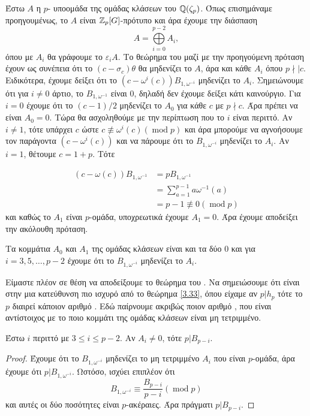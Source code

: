 \noindent Έστω $A$ η $p$- υποομάδα της ομάδας κλάσεων του $\mathbb{Q}(\zeta_p)$. Όπως επισημάναμε προηγουμένως, το $A$ είναι $\mathbb{Z}_p[G]$-πρότυπο και άρα έχουμε την διάσπαση
$$A = \bigoplus\limits_{i=0}^{p-2}A_i,$$
όπου με $A_i$ θα γράφουμε το $\varepsilon_i A$. Το θεώρημα του  μαζί με την προηγούμενη πρόταση έχουν ως συνέπεια ότι 
το $(c-\sigma_c)\theta$ θα μηδενίζει το $A$, άρα και κάθε $A_i$ όπου $p\nmid | c$. Ειδικότερα, έχουμε δείξει ότι το 
$(c-\omega^i(c))B_{1,\omega^{-i}}$ μηδενίζει το $A_i$. Σημειώνουμε ότι για $i\neq 0$ άρτιο, το $B_{1,\omega^{-1}}$ είναι $0$, δηλαδή 
δεν έχουμε δείξει κάτι καινούργιο. Για $i=0$ έχουμε ότι το $(c-1)/2$ μηδενίζει το $A_0$ για κάθε $c$ με $p\nmid c$. Άρα πρέπει να είναι 
$A_0 = 0$. Τώρα θα ασχοληθούμε με την περίπτωση που το $i$ είναι περιττό. Αν $i\neq 1$, τότε υπάρχει $c$ ώστε 
$c\not\equiv \omega^i(c)(\operatorname{mod}p)$ και άρα μπορούμε να αγνοήσουμε τον παράγοντα $(c-\omega^i(c))$ και να πάρουμε ότι 
το $B_{1,\omega^{-i}}$ μηδενίζει το $A_i$. Αν $i=1$, θέτουμε $c=1+p$. Τότε 

\begin{align*}
	(c-\omega(c))B_{1,\omega^{-1}} &= pB_{1,\omega^{-1}} \\
	&= \sum\limits_{a=1}^{p-1}a\omega^{-1}(a) \\ 
	&= p-1 \not\equiv 0 (\operatorname{mod}p)
\end{align*}
και καθώς το $A_1$ είναι $p$-ομάδα, υποχρεωτικά έχουμε $A_1 = 0$. Άρα έχουμε αποδείξει την ακόλουθη πρόταση.

\begin{prop}
	Τα κομμάτια $A_0$ και $A_1$ της ομάδας κλάσεων είναι και τα δύο $0$ και για $i=3,5,\ldots,p-2$ έχουμε ότι το $B_{1,\omega^{-i}}$ μηδενίζει το $A_i$.
\end{prop}

\noindent Είμαστε πλέον σε θέση να αποδείξουμε το θεώρημα του . Να σημειώσουμε ότι είναι στην μια κατεύθυνση πιο ισχυρό 
από το θεώρημα \ref{3.33}, όπου είχαμε αν $p|h_p$ τότε το $p$ διαιρεί κάποιον αριθμό . Εδώ παίρνουμε ακριβώς ποιον αριθμό 
, που είναι αντίστοιχος με το ποιο κομμάτι της ομάδας κλάσεων είναι μη τετριμμένο. 

\begin{theorem}
	Έστω $i$ περιττό με $3\leq i \leq p-2$. Αν $A_i \neq 0$, τότε $p|B_{p-i}$.
\end{theorem}

\begin{proof}
	Έχουμε ότι το $B_{1,\omega^{-i}}$ μηδενίζει το μη τετριμμένο $A_i$ που είναι $p$-ομάδα, άρα έχουμε ότι $p|B_{1,\omega^{-i}}$. Ωστόσο, 
	ισχύει επιπλέον ότι
	$$B_{1,\omega^{-i}} \equiv \frac{B_{p-i}}{p-i} (\operatorname{mod}p)$$ και αυτές οι δύο ποσότητες είναι $p$-ακέραιες. Άρα πράγματι $p|B_{p-i}$.
\end{proof}

